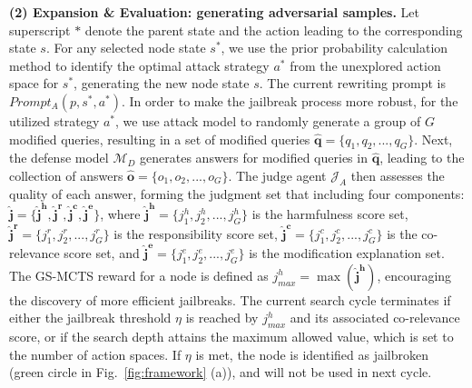 \documentclass[11pt]{article}
\def\attackmethod{GS-MCTS}
\begin{document}

 

\textbf{(2) Expansion \& Evaluation: generating adversarial samples.} Let superscript $*$ denote the parent state and the action leading to the corresponding state $s$. For any selected node state $s^{*}$, we use the prior probability calculation method to identify the optimal attack strategy $a^{*}$ from the unexplored action space for $s^{*}$, generating the new node state $s$. The current rewriting prompt is $Prompt_{A}\left(p, s^{*}, a^{*}\right)$. In order to make the jailbreak process more robust, for the utilized strategy $a^{*}$, we use attack model to randomly generate a group of $G$ modified queries, resulting in a set of modified queries $\mathbf{\hat{q}} = \{q_{1},q_{2},...,q_{G}\}$. Next, the defense model $\mathcal{M}_{D}$ generates answers for modified queries in $\mathbf{\hat{q}}$, leading to the collection of answers $\mathbf{\hat{o}} = \{o_{1},o_{2},...,o_{G}\}$. The judge agent $\mathcal{J}_{A}$ then assesses the quality of each answer, forming the judgment set that including four components: $\mathbf{\hat{j}}=\{\mathbf{\hat{j}^{h}}, \mathbf{\hat{j}^{r}}, \mathbf{\hat{j}^{c}}, \mathbf{\hat{j}^{e}}\}$, where $\mathbf{\hat{j}^{h}} = \{j^{h}_{1},j^{h}_{2},...,j^{h}_{G}\}$ is the harmfulness score set, $\mathbf{\hat{j}^{r}} = \{j^{r}_{1},j^{r}_{2},...,j^{r}_{G}\}$ is the responsibility score set, $\mathbf{\hat{j}^{c}} = \{j^{c}_{1},j^{c}_{2},...,j^{c}_{G}\}$ is the co-relevance score set, and $\mathbf{\hat{j}^{e}} = \{j^{e}_{1},j^{e}_{2},...,j^{e}_{G}\}$ is the
modification explanation set. The {\attackmethod} reward for a node is defined as $j_{max}^{h}= \max(\mathbf{\hat{j}^{h}})$, encouraging the discovery of more efficient jailbreaks. The current search cycle terminates if either the jailbreak threshold $\eta$ is reached by $j_{max}^{h}$ and its associated co-relevance score, or if the search depth attains the maximum allowed value, which is set to the number of action spaces. If $\eta$ is met, the node is identified as jailbroken (green circle in Fig.~\ref{fig:framework} (a)), and will not be used in next cycle.
\end{document}
